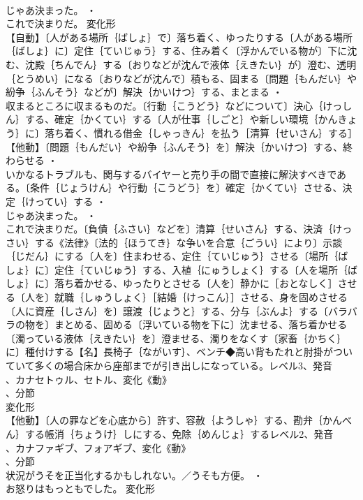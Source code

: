 \documentclass[8pt]{extreport}
\begin{document}
\begin{CJK}{UTF8}{min}
\\	じゃあ決まった。 ・
\\	これで決まりだ。	変化形 
\\	【自動】〔人がある場所｛ばしょ｝で〕落ち着く、ゆったりする〔人がある場所｛ばしょ｝に〕定住｛ていじゅう｝する、住み着く〔浮かんでいる物が〕下に沈む、沈殿｛ちんでん｝する〔おりなどが沈んで液体｛えきたい｝が〕澄む、透明｛とうめい｝になる〔おりなどが沈んで〕積もる、固まる〔問題｛もんだい｝や紛争｛ふんそう｝などが〕解決｛かいけつ｝する、まとまる ・
\\	収まるところに収まるものだ。〔行動｛こうどう｝などについて〕決心｛けっしん｝する、確定｛かくてい｝する〔人が仕事｛しごと｝や新しい環境｛かんきょう｝に〕落ち着く、慣れる借金｛しゃっきん｝を払う［清算｛せいさん｝する］【他動】〔問題｛もんだい｝や紛争｛ふんそう｝を〕解決｛かいけつ｝する、終わらせる ・
\\	いかなるトラブルも、関与するバイヤーと売り手の間で直接に解決すべきである。〔条件｛じょうけん｝や行動｛こうどう｝を〕確定｛かくてい｝させる、決定｛けってい｝する ・
\\	じゃあ決まった。 ・
\\	これで決まりだ。〔負債｛ふさい｝などを〕清算｛せいさん｝する、決済｛けっさい｝する《法律》〔法的｛ほうてき｝な争いを合意｛ごうい｝により〕示談｛じだん｝にする〔人を〕住まわせる、定住｛ていじゅう｝させる〔場所｛ばしょ｝に〕定住｛ていじゅう｝する、入植｛にゅうしょく｝する〔人を場所｛ばしょ｝に〕落ち着かせる、ゆったりとさせる〔人を〕静かに［おとなしく］させる〔人を〕就職｛しゅうしょく｝［結婚｛けっこん｝］させる、身を固めさせる〔人に資産｛しさん｝を〕譲渡｛じょうと｝する、分与｛ぶんよ｝する〔バラバラの物を〕まとめる、固める〔浮いている物を下に〕沈ませる、落ち着かせる〔濁っている液体｛えきたい｝を〕澄ませる、濁りをなくす〔家畜｛かちく｝に〕種付けする【名】長椅子｛ながいす｝、ベンチ◆高い背もたれと肘掛がついていて多くの場合床から座部までが引き出しになっている。レベル3、発音
\\	、カナセトゥル、セトル、変化《動》
\\	、分節
\\	変化形 
\\	【他動】〔人の罪などを心底から〕許す、容赦｛ようしゃ｝する、勘弁｛かんべん｝する帳消｛ちょうけ｝しにする、免除｛めんじょ｝するレベル2、発音
\\	、カナファギブ、フォアギブ、変化《動》
\\	、分節
\\	状況がうそを正当化するかもしれない。／うそも方便。 ・
\\	お怒りはもっともでした。	変化形 

\end{CJK}
\end{document}
